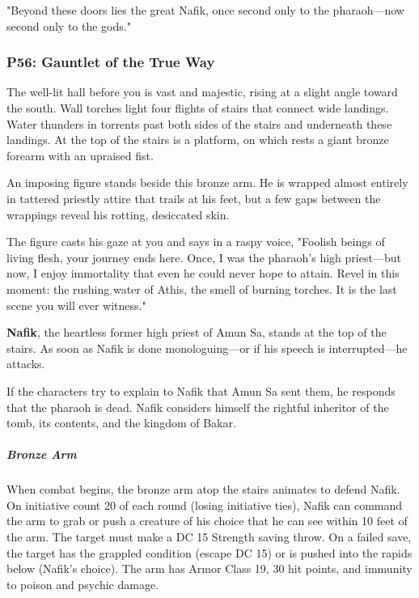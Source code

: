 \documentclass[10pt,a4paper,twoside,bg=print,twocolumn,openany,nodeprecatedcode]{dndbook}
\begin{document}
\begin{DndReadAloud}{}
"Beyond these doors lies the great Nafik, once second only to the pharaoh—now second only to the gods."

\end{DndReadAloud}

\subsubsection{P56: Gauntlet of the True Way}
\begin{DndReadAloud}{}
The well-lit hall before you is vast and majestic, rising at a slight angle toward the south. Wall torches light four flights of stairs that connect wide landings. Water thunders in torrents past both sides of the stairs and underneath these landings. At the top of the stairs is a platform, on which rests a giant bronze forearm with an upraised fist.

An imposing figure stands beside this bronze arm. He is wrapped almost entirely in tattered priestly attire that trails at his feet, but a few gaps between the wrappings reveal his rotting, desiccated skin.

The figure casts his gaze at you and says in a raspy voice, "Foolish beings of living flesh, your journey ends here. Once, I was the pharaoh's high priest—but now, I enjoy immortality that even he could never hope to attain. Revel in this moment: the rushing water of Athis, the smell of burning torches. It is the last scene you will ever witness."

\end{DndReadAloud}

\textbf{Nafik}, the heartless former high priest of Amun Sa, stands at the top of the stairs. As soon as Nafik is done monologuing—or if his speech is interrupted—he attacks.

If the characters try to explain to Nafik that Amun Sa sent them, he responds that the pharaoh is dead. Nafik considers himself the rightful inheritor of the tomb, its contents, and the kingdom of Bakar.

\subparagraph{Bronze Arm}
When combat begins, the bronze arm atop the stairs animates to defend Nafik. On initiative count 20 of each round (losing initiative ties), Nafik can command the arm to grab or push a creature of his choice that he can see within 10 feet of the arm. The target must make a DC 15 Strength saving throw. On a failed save, the target has the grappled condition (escape DC 15) or is pushed into the rapids below (Nafik's choice). The arm has Armor Class 19, 30 hit points, and immunity to poison and psychic damage.
\end{document}
